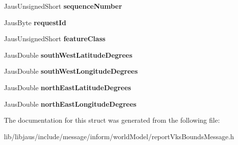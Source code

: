 \begin{DoxyCompactItemize}
\item 
\hypertarget{struct_report_vks_bounds_message_struct_af9f2f7c971218a0e185b43c3561338ea}{\-Jaus\-Unsigned\-Short {\bfseries sequence\-Number}}\label{struct_report_vks_bounds_message_struct_af9f2f7c971218a0e185b43c3561338ea}

\item 
\hypertarget{struct_report_vks_bounds_message_struct_acc1dfabb05d22b9c2c8b328b27d05c38}{\-Jaus\-Byte {\bfseries request\-Id}}\label{struct_report_vks_bounds_message_struct_acc1dfabb05d22b9c2c8b328b27d05c38}

\item 
\hypertarget{struct_report_vks_bounds_message_struct_abca8752c7276f2c3791138e14817a951}{\-Jaus\-Unsigned\-Short {\bfseries feature\-Class}}\label{struct_report_vks_bounds_message_struct_abca8752c7276f2c3791138e14817a951}

\item 
\hypertarget{struct_report_vks_bounds_message_struct_a36c1877922bccaa7a30d044f1678aa18}{\-Jaus\-Double {\bfseries south\-West\-Latitude\-Degrees}}\label{struct_report_vks_bounds_message_struct_a36c1877922bccaa7a30d044f1678aa18}

\item 
\hypertarget{struct_report_vks_bounds_message_struct_abaea5d0d1e72fc5ac90d61b58395f7c0}{\-Jaus\-Double {\bfseries south\-West\-Longitude\-Degrees}}\label{struct_report_vks_bounds_message_struct_abaea5d0d1e72fc5ac90d61b58395f7c0}

\item 
\hypertarget{struct_report_vks_bounds_message_struct_ac94842e587733ab2aa30e33d35315798}{\-Jaus\-Double {\bfseries north\-East\-Latitude\-Degrees}}\label{struct_report_vks_bounds_message_struct_ac94842e587733ab2aa30e33d35315798}

\item 
\hypertarget{struct_report_vks_bounds_message_struct_a6ead3e3539d90d2e2c77370fb5892ad1}{\-Jaus\-Double {\bfseries north\-East\-Longitude\-Degrees}}\label{struct_report_vks_bounds_message_struct_a6ead3e3539d90d2e2c77370fb5892ad1}

\end{DoxyCompactItemize}


\-The documentation for this struct was generated from the following file\-:\begin{DoxyCompactItemize}
\item 
lib/libjaus/include/message/inform/world\-Model/report\-Vks\-Bounds\-Message.\-h\end{DoxyCompactItemize}
